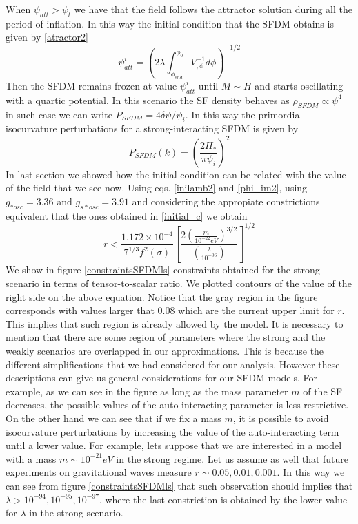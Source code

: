 \documentclass[amssymb,twocolumn,prd,nofootinbib,showpacs]{revtex4-1}
\begin{document}
When $\psi_{att}>\psi_t$ we have that the field follows the attractor solution during all the period of inflation. In this way the initial condition that the SFDM obtains is given by \eqref{atractor2}
\begin{equation}\label{atractor3}
\psi_{att}^i = \left(2\lambda\int_{\phi_{end}}^{\phi_0}V^{-1}_{,\phi}d\phi\right)^{-1/2}
\end{equation}
Then the SFDM remains frozen at value $\psi_{att}^i$ until $M\sim H$ and starts oscillating with a quartic potential. In this scenario the SF density behaves as $\rho_{SFDM}\propto \psi^4$ in such case we can write $P_{SFDM}=4\delta\psi/\psi_i$. In this way the primordial isocurvature perturbations for a strong-interacting SFDM is given by
\begin{equation}
P_{SFDM}(k)=\left(\frac{2H_*}{\pi\psi_i}\right)^2
\end{equation}
In last section we showed how the initial condition can be related with the value of the field that we see now. Using eqs. \eqref{inilamb2} and \eqref{phi_im2}, using $g_{*osc}=3.36$ and $g_{s*osc}=3.91$  and considering the appropiate constrictions equivalent that the ones obtained in \eqref{initial_c} we obtain
\begin{equation}\label{constr4}
r<\frac{1.172\times 10^{-4}}{7^{1/3}f^2(\sigma)}\left[\frac{2\left(\frac{m}{10^{-22}eV}\right)^{3/2}}{\left(\frac{\lambda}{10^{-96}}\right)}\right]^{1/2}
\end{equation}
We show in figure \ref{constraintsSFDMls} constraints obtained for the strong scenario in terms of tensor-to-scalar ratio. We plotted contours of the value of the right side on the above equation. Notice that the gray region in the figure corresponds with values larger that $0.08$ which are the current upper limit for $r$. This implies that such region is already allowed by the model. It is necessary to mention that there are some region of parameters where the strong and the weakly scenarios are overlapped in our approximations. This is because the different simplifications that we had considered for our analysis. However these descriptions can give us general considerations for our SFDM models. For example, as we can see in the figure as long as the mass parameter $m$ of the SF decreases, the possible values of the auto-interacting parameter is less restrictive. On the other hand we can see that if we fix a mass $m$, it is possible to avoid isocurvature perturbations by increasing the value of the auto-interacting term until a lower value. For example, lets suppose that we are interested in a model with a mass $m\sim 10^{-21} eV$ in the strong regime. Let us assume as well that future experiments on gravitational waves measure $r\sim 0.05,0.01,0.001$. In this way we can see from figure \ref{constraintsSFDMls} that such observation should implies that $\lambda>10^{-94},10^{-95},10^{-97}$, where the last constriction is obtained by the lower value for $\lambda$ in the strong scenario.   
\end{document}
